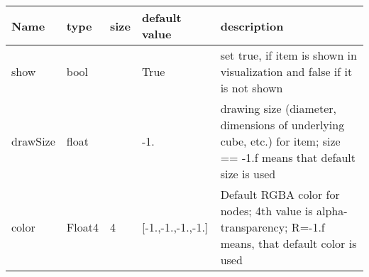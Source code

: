 \begin{center}
  \footnotesize
  \begin{longtable}{| p{4.5cm} | p{2.5cm} | p{0.5cm} | p{2.5cm} | p{6cm} |}
    \hline
    \bf Name & \bf type & \bf size & \bf default value & \bf description \\ \hline
    show &     bool &      &     True &     set true, if item is shown in visualization and false if it is not shown\\ \hline
    drawSize &     float &      &     -1. &     drawing size (diameter, dimensions of underlying cube, etc.)  for item; size == -1.f means that default size is used\\ \hline
    color &     Float4 &     4 &     [-1.,-1.,-1.,-1.] &     Default RGBA color for nodes; 4th value is alpha-transparency; R=-1.f means, that default color is used\\ \hline
	  \end{longtable}
	\end{center}

